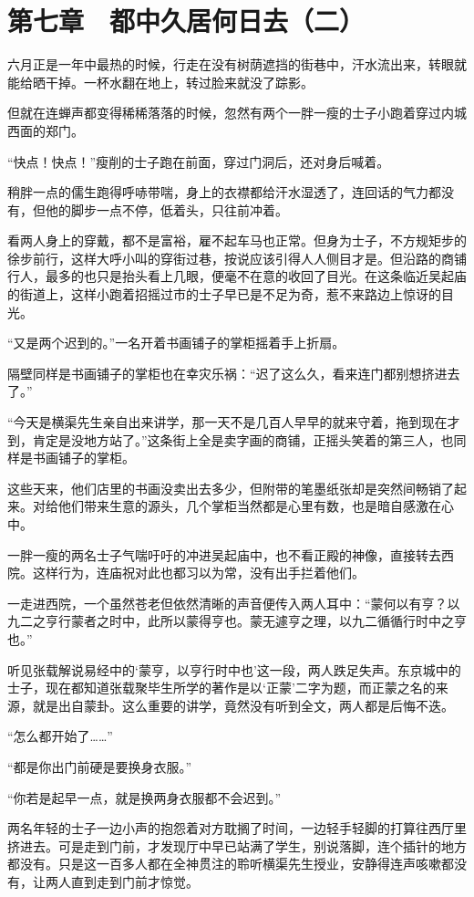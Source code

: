 \section{第七章　都中久居何日去（二）}

六月正是一年中最热的时候，行走在没有树荫遮挡的街巷中，汗水流出来，转眼就能给晒干掉。一杯水翻在地上，转过脸来就没了踪影。

但就在连蝉声都变得稀稀落落的时候，忽然有两个一胖一瘦的士子小跑着穿过内城西面的郑门。

“快点！快点！”瘦削的士子跑在前面，穿过门洞后，还对身后喊着。

稍胖一点的儒生跑得呼哧带喘，身上的衣襟都给汗水湿透了，连回话的气力都没有，但他的脚步一点不停，低着头，只往前冲着。

看两人身上的穿戴，都不是富裕，雇不起车马也正常。但身为士子，不方规矩步的徐步前行，这样大呼小叫的穿街过巷，按说应该引得人人侧目才是。但沿路的商铺行人，最多的也只是抬头看上几眼，便毫不在意的收回了目光。在这条临近吴起庙的街道上，这样小跑着招摇过市的士子早已是不足为奇，惹不来路边上惊讶的目光。

“又是两个迟到的。”一名开着书画铺子的掌柜摇着手上折扇。

隔壁同样是书画铺子的掌柜也在幸灾乐祸：“迟了这么久，看来连门都别想挤进去了。”

“今天是横渠先生亲自出来讲学，那一天不是几百人早早的就来守着，拖到现在才到，肯定是没地方站了。”这条街上全是卖字画的商铺，正摇头笑着的第三人，也同样是书画铺子的掌柜。

这些天来，他们店里的书画没卖出去多少，但附带的笔墨纸张却是突然间畅销了起来。对给他们带来生意的源头，几个掌柜当然都是心里有数，也是暗自感激在心中。

一胖一瘦的两名士子气喘吁吁的冲进吴起庙中，也不看正殿的神像，直接转去西院。这样行为，连庙祝对此也都习以为常，没有出手拦着他们。

一走进西院，一个虽然苍老但依然清晰的声音便传入两人耳中：“蒙何以有亨？以九二之亨行蒙者之时中，此所以蒙得亨也。蒙无遽亨之理，以九二循循行时中之亨也。”

听见张载解说易经中的‘蒙亨，以亨行时中也’这一段，两人跌足失声。东京城中的士子，现在都知道张载聚毕生所学的著作是以‘正蒙’二字为题，而正蒙之名的来源，就是出自蒙卦。这么重要的讲学，竟然没有听到全文，两人都是后悔不迭。

“怎么都开始了……”

“都是你出门前硬是要换身衣服。”

“你若是起早一点，就是换两身衣服都不会迟到。”

两名年轻的士子一边小声的抱怨着对方耽搁了时间，一边轻手轻脚的打算往西厅里挤进去。可是走到门前，才发现厅中早已站满了学生，别说落脚，连个插针的地方都没有。只是这一百多人都在全神贯注的聆听横渠先生授业，安静得连声咳嗽都没有，让两人直到走到门前才惊觉。

